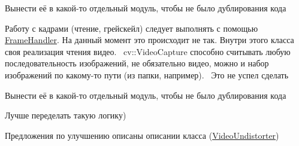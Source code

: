 
\begin{DoxyRefList}
\item[Член \mbox{\hyperlink{class_camera_calibrator_a2216558d0c8e967ad3ccfcfd0bf769d9}{Camera\+Calibrator\+::Add\+Tips}} (Mat \&frame, std\+::string tip)]\label{todo__todo000001}%
%
Вынести её в какой-\/то отдельный модуль, чтобы не было дублирования кода  
\item[Класс \mbox{\hyperlink{class_video_undistorter}{Video\+Undistorter}} ]\label{todo__todo000002}%
%
Работу с кадрами (чтение, грейскейл) следует выполнять с помощью \mbox{\hyperlink{class_frame_handler}{Frame\+Handler}}. На данный момент это происходит не так. Внутри этого класса своя реализация чтения видео.~\newline
cv\+::\+Video\+Capture способно считывать любую последовательность изображений, не обязательно видео, можно и набор изображений по какому-\/то пути (из папки, например).~\newline
Это не успел сделать  
\item[Член \mbox{\hyperlink{class_video_undistorter_a015a3e4b982094d3ba737debd9f3590e}{Video\+Undistorter\+::Add\+Tips}} (Mat \&frame, std\+::string tip)]\label{todo__todo000004}%
%
Вынести её в какой-\/то отдельный модуль, чтобы не было дублирования кода  
\item[Член \mbox{\hyperlink{class_video_undistorter_a05b19bb1af0c5fcfd147c48dd447d44d}{Video\+Undistorter\+::Execute\+Video\+Undistortion}} ()]\label{todo__todo000003}%
%
Лучше переделать такую логику)  
\item[Член \mbox{\hyperlink{class_video_undistorter_ac82e158db201e5d3189cc2c2eaa0db46}{Video\+Undistorter\+::Save\+Frame}} (Mat frame)]\label{todo__todo000005}%
%
Предложения по улучшению описаны описании класса (\mbox{\hyperlink{class_video_undistorter}{Video\+Undistorter}}) 
\end{DoxyRefList}